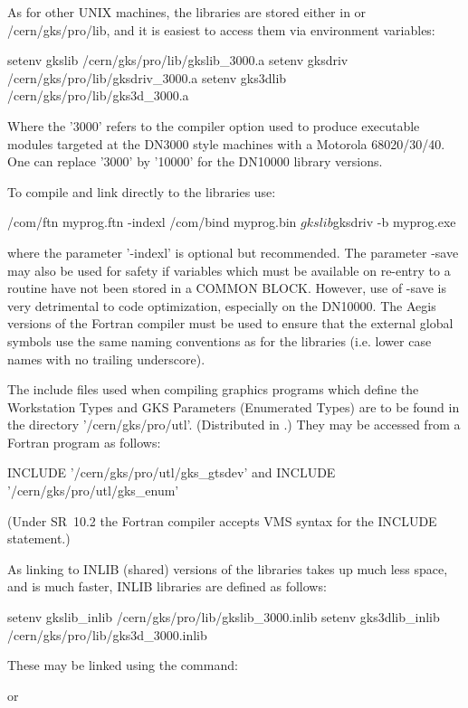 As for other UNIX machines, the libraries are stored either in
 or /cern/gks/pro/lib, and it is easiest to access
them via environment variables:
\begin{XMP}
setenv gkslib    /cern/gks/pro/lib/gkslib_3000.a
setenv gksdriv   /cern/gks/pro/lib/gksdriv_3000.a
setenv gks3dlib  /cern/gks/pro/lib/gks3d_3000.a
\end{XMP}
Where the '3000' refers to the compiler option used to produce executable modules
targeted at the DN3000 style machines with a Motorola 68020/30/40. One
can replace '3000' by '10000' for the DN10000 library versions.
 
To compile and link directly to the libraries use:
\begin{XMP}
/com/ftn  myprog.ftn  -indexl
/com/bind myprog.bin  $gkslib $gksdriv -b myprog.exe
\end{XMP}
where the parameter '-indexl' is optional but recommended.
The parameter -save may also be used for safety if variables which must be
available on re-entry to a routine have not been stored in a COMMON BLOCK.
However, use of -save is very detrimental to code optimization,
especially on the DN10000. The Aegis versions of the Fortran compiler
must be used to ensure that the external global symbols use the same
naming conventions as for the libraries (i.e. lower case names with
no trailing underscore).
 
The include files used when compiling graphics programs which
define the Workstation Types and GKS Parameters (Enumerated Types)
are to be found in the directory '/cern/gks/pro/utl'.
(Distributed in .)
They may be accessed from a Fortran program as follows:
\begin{XMP}
      INCLUDE '/cern/gks/pro/utl/gks_gtsdev'
 and
      INCLUDE '/cern/gks/pro/utl/gks_enum'
\end{XMP}
(Under SR~10.2 the Fortran compiler accepts VMS syntax for the
INCLUDE statement.)
 
As linking to INLIB (shared) versions of the libraries takes up much less
space, and is much faster, INLIB libraries are defined as follows:
\begin{XMP}
setenv gkslib_inlib    /cern/gks/pro/lib/gkslib_3000.inlib
setenv gks3dlib_inlib  /cern/gks/pro/lib/gks3d_3000.inlib
\end{XMP}
These may be linked using the command:
\begin{XMP}
                  or
\end{XMP}
 
